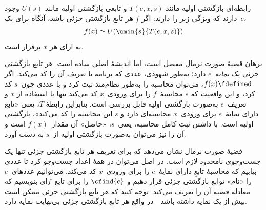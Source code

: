 \documentclass[../../../include/open-logic-section]{subfiles}
\begin{document}

\begin{thm}
رابطه‌ای بازگشتی اولیه مانند $T(e,x,s)$ و تابعی بازگشتی اولیه مانند
$U(s)$ وجود دارند که ویژگی زیر را دارند: اگر $f$ هر تابع بازگشتی
جزئی باشد، آنگاه برای یک~$e$،
\[
f(x) \simeq U(\umin{s}{T(e, x, s)})
\]
به ازای هر $x$ برقرار است.
\end{thm}

\begin{explain}
برهان قضیهٔ صورت نرمال مفصل است، اما اندیشهٔ اصلی ساده است. هر تابع
بازگشتی جزئی یک \emph{نمایه}~$e$ دارد؛ به‌طور شهودی، عددی که برنامه
یا تعریف آن را کد می‌کند. اگر $f(x)\fdefined$، می‌توان محاسبه را
به‌طور نظام‌مند ثبت کرد و با عددی چون~$s$ کد کرد، و این واقعیت که
$s$ محاسبهٔ~$f$ را برای ورودی~$x$ کد می‌کند تنها با استفاده از $x$
و تعریف~$e$ به‌صورت بازگشتی اولیه قابل بررسی است. بنابراین رابطهٔ
$T$، یعنی «تابع دارای نمایهٔ~$e$ برای ورودی~$x$ محاسبه‌ای دارد و
$s$ این محاسبه را کد می‌کند»، بازگشتی اولیه است. با داشتن ثبت کامل
محاسبه، یعنی~$s$، «حاصل» آن مقدار~$f(x)$ است و آن را نیز می‌توان
به‌صورت بازگشتی اولیه از~$s$ به دست آورد.

قضیهٔ صورت نرمال نشان می‌دهد که برای تعریف هر تابع بازگشتی جزئی تنها
یک جست‌وجوی نامحدود لازم است. در اصل می‌توان در همهٔ اعداد جست‌وجو
کرد تا عددی بیابیم که محاسبهٔ تابعِ دارای نمایهٔ~$e$ را برای
ورودی~$x$ کد می‌کند. می‌توانیم عددهای~$e$ را «نام» توابع بازگشتی
جزئی قرار دهیم و $\cfind{e}$ را برای تابع~$f$ای بنویسیم که معادلهٔ
قضیه آن را تعریف می‌کند. توجه کنید که هر تابع بازگشتی جزئی ممکن است
بیش از یک نمایه داشته باشد---در واقع هر تابع بازگشتی جزئی بی‌نهایت
نمایه دارد.
\end{explain}
\end{document}
